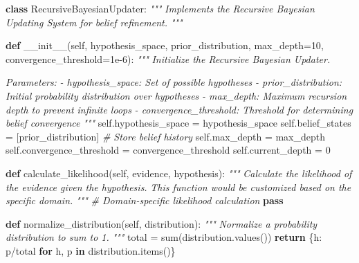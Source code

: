\documentclass[
]{article}
\newenvironment{Shaded}{}{}
\newcommand{\BuiltInTok}[1]{\textcolor[rgb]{0.00,0.50,0.00}{#1}}
\newcommand{\CommentTok}[1]{\textcolor[rgb]{0.38,0.63,0.69}{\textit{#1}}}
\newcommand{\ControlFlowTok}[1]{\textcolor[rgb]{0.00,0.44,0.13}{\textbf{#1}}}
\newcommand{\DecValTok}[1]{\textcolor[rgb]{0.25,0.63,0.44}{#1}}
\newcommand{\FloatTok}[1]{\textcolor[rgb]{0.25,0.63,0.44}{#1}}
\newcommand{\FunctionTok}[1]{\textcolor[rgb]{0.02,0.16,0.49}{#1}}
\newcommand{\KeywordTok}[1]{\textcolor[rgb]{0.00,0.44,0.13}{\textbf{#1}}}
\newcommand{\NormalTok}[1]{#1}
\newcommand{\OperatorTok}[1]{\textcolor[rgb]{0.40,0.40,0.40}{#1}}
\newcommand{\VariableTok}[1]{\textcolor[rgb]{0.10,0.09,0.49}{#1}}
\begin{document}
\begin{Shaded}
\begin{Highlighting}[]
\KeywordTok{class}\NormalTok{ RecursiveBayesianUpdater:}
    \CommentTok{"""}
\CommentTok{    Implements the Recursive Bayesian Updating System for belief refinement.}
\CommentTok{    """}

    \KeywordTok{def} \FunctionTok{\_\_init\_\_}\NormalTok{(}\VariableTok{self}\NormalTok{, hypothesis\_space, prior\_distribution, max\_depth}\OperatorTok{=}\DecValTok{10}\NormalTok{, convergence\_threshold}\OperatorTok{=}\FloatTok{1e{-}6}\NormalTok{):}
        \CommentTok{"""}
\CommentTok{        Initialize the Recursive Bayesian Updater.}

\CommentTok{        Parameters:}
\CommentTok{        {-} hypothesis\_space: Set of possible hypotheses}
\CommentTok{        {-} prior\_distribution: Initial probability distribution over hypotheses}
\CommentTok{        {-} max\_depth: Maximum recursion depth to prevent infinite loops}
\CommentTok{        {-} convergence\_threshold: Threshold for determining belief convergence}
\CommentTok{        """}
        \VariableTok{self}\NormalTok{.hypothesis\_space }\OperatorTok{=}\NormalTok{ hypothesis\_space}
        \VariableTok{self}\NormalTok{.belief\_states }\OperatorTok{=}\NormalTok{ [prior\_distribution]  }\CommentTok{\# Store belief history}
        \VariableTok{self}\NormalTok{.max\_depth }\OperatorTok{=}\NormalTok{ max\_depth}
        \VariableTok{self}\NormalTok{.convergence\_threshold }\OperatorTok{=}\NormalTok{ convergence\_threshold}
        \VariableTok{self}\NormalTok{.current\_depth }\OperatorTok{=} \DecValTok{0}

    \KeywordTok{def}\NormalTok{ calculate\_likelihood(}\VariableTok{self}\NormalTok{, evidence, hypothesis):}
        \CommentTok{"""}
\CommentTok{        Calculate the likelihood of the evidence given the hypothesis.}
\CommentTok{        This function would be customized based on the specific domain.}
\CommentTok{        """}
        \CommentTok{\# Domain{-}specific likelihood calculation}
        \ControlFlowTok{pass}

    \KeywordTok{def}\NormalTok{ normalize\_distribution(}\VariableTok{self}\NormalTok{, distribution):}
        \CommentTok{"""}
\CommentTok{        Normalize a probability distribution to sum to 1.}
\CommentTok{        """}
\NormalTok{        total }\OperatorTok{=} \BuiltInTok{sum}\NormalTok{(distribution.values())}
        \ControlFlowTok{return}\NormalTok{ \{h: p}\OperatorTok{/}\NormalTok{total }\ControlFlowTok{for}\NormalTok{ h, p }\KeywordTok{in}\NormalTok{ distribution.items()\}}


\end{Highlighting}
\end{Shaded}
\end{document}

